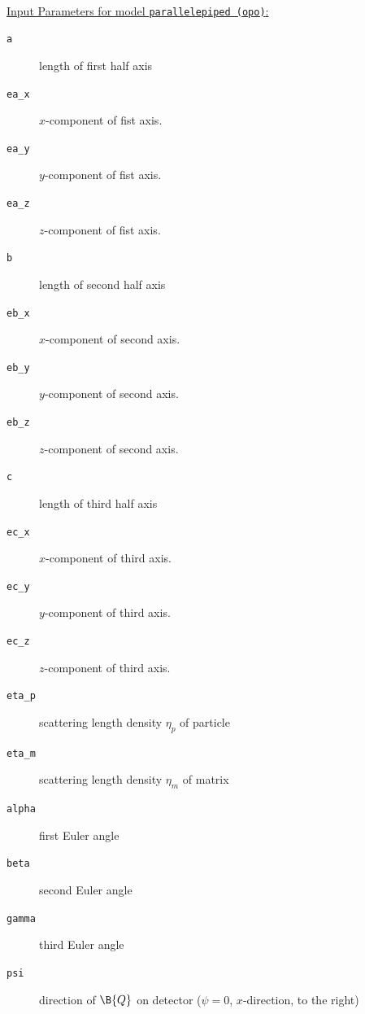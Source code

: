 ~\\
\uline{Input Parameters for model \texttt{parallelepiped (opo)}:}
\begin{description}
\item[\texttt{a}] length of first half axis
\item[\texttt{ea\_x}] $x$-component of fist axis.
\item[\texttt{ea\_y}] $y$-component of fist axis.
\item[\texttt{ea\_z}] $z$-component of fist axis.
\item[\texttt{b}] length of second half axis
\item[\texttt{eb\_x}] $x$-component of second axis.
\item[\texttt{eb\_y}] $y$-component of second axis.
\item[\texttt{eb\_z}] $z$-component of second axis.
\item[\texttt{c}] length of third half axis
\item[\texttt{ec\_x}] $x$-component of third axis.
\item[\texttt{ec\_y}] $y$-component of third axis.
\item[\texttt{ec\_z}] $z$-component of third axis.
\item[\texttt{eta\_p}] scattering length density $\eta_p$ of particle
\item[\texttt{eta\_m}] scattering length density $\eta_m$ of matrix
\item[\texttt{alpha}] first Euler angle
\item[\texttt{beta}] second Euler angle
\item[\texttt{gamma}] third Euler angle
\item[\texttt{psi}] direction of $\B{Q}$ on detector ($\psi=0$, $x$-direction, to the right)
\end{description}

